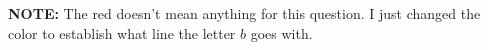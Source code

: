 \documentclass[12pt]{article}
\begin{document}
\begin{enumerate}
\textbf{NOTE:} The red doesn't mean anything for this question. I just changed the color to establish what line the letter $b$ goes with.


\end{enumerate}
\end{document}
